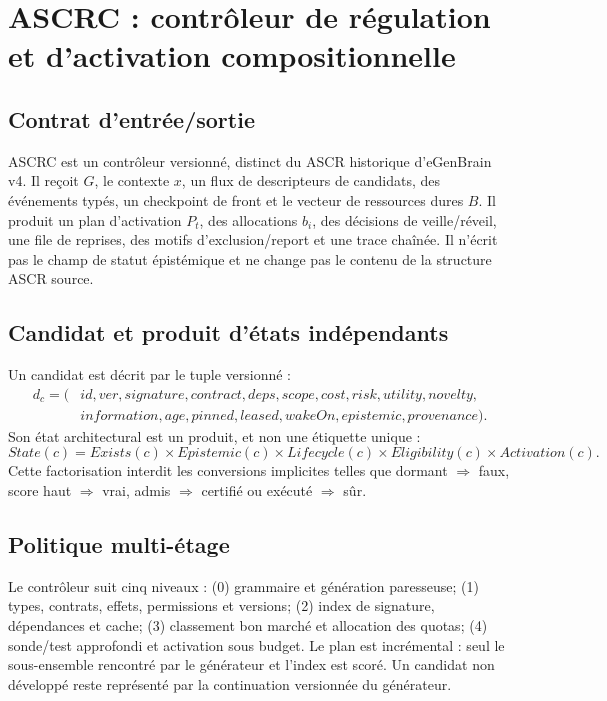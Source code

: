 \documentclass[11pt,a4paper]{article}
\begin{document}
\section{ASCRC : contrôleur de régulation et d'activation compositionnelle}
\subsection{Contrat d'entrée/sortie}
ASCRC est un contrôleur versionné, distinct du ASCR historique d'eGenBrain v4. Il reçoit $G$, le contexte $x$, un flux de descripteurs de candidats, des événements typés, un checkpoint de front et le vecteur de ressources dures $B$. Il produit un plan d'activation $P_t$, des allocations $b_i$, des décisions de veille/réveil, une file de reprises, des motifs d'exclusion/report et une trace chaînée. Il n'écrit pas le champ de statut épistémique et ne change pas le contenu de la structure ASCR source.

\subsection{Candidat et produit d'états indépendants}
Un candidat est décrit par le tuple versionné :
\[
\begin{aligned}
 d_c=(&id,ver,signature,contract,deps,scope,cost,risk,utility,novelty,\\
      &information,age,pinned,leased,wakeOn,epistemic,provenance).
\end{aligned}
\]
Son état architectural est un produit, et non une étiquette unique :
\[
 State(c)=Exists(c)\times Epistemic(c)\times Lifecycle(c)\times Eligibility(c)\times Activation(c).
\]
Cette factorisation interdit les conversions implicites telles que dormant $\Rightarrow$ faux, score haut $\Rightarrow$ vrai, admis $\Rightarrow$ certifié ou exécuté $\Rightarrow$ sûr.

\subsection{Politique multi-étage}
Le contrôleur suit cinq niveaux : (0) grammaire et génération paresseuse; (1) types, contrats, effets, permissions et versions; (2) index de signature, dépendances et cache; (3) classement bon marché et allocation des quotas; (4) sonde/test approfondi et activation sous budget. Le plan est incrémental : seul le sous-ensemble rencontré par le générateur et l'index est scoré. Un candidat non développé reste représenté par la continuation versionnée du générateur.
\end{document}
